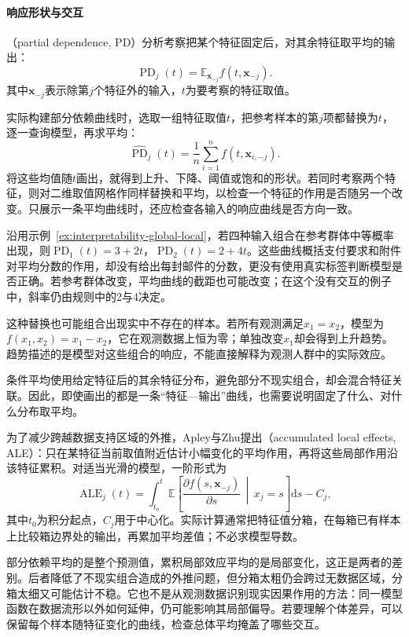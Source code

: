 \paragraph{响应形状与交互}

（partial dependence, PD）分析考察把某个特征固定后，对其余特征取平均的输出：
\[
 \operatorname{PD}_j(t)
 =\mathbb E_{\bm{x}_{-j}}f(t,\bm{x}_{-j}).
\]
其中$\bm{x}_{-j}$表示除第$j$个特征外的输入，$t$为要考察的特征取值。

实际构建部分依赖曲线时，选取一组特征取值$t$，把参考样本的第$j$项都替换为$t$，逐一查询模型，再求平均：
\[
 \widehat{\operatorname{PD}}_j(t)
 =\frac1n\sum_{i=1}^n f(t,\bm{x}_{i,-j}).
\]
将这些均值随$t$画出，就得到上升、下降、阈值或饱和的形状。若同时考察两个特征，则对二维取值网格作同样替换和平均，以检查一个特征的作用是否随另一个改变。只展示一条平均曲线时，还应检查各输入的响应曲线是否方向一致。

沿用示例~\ref{ex:interpretability-global-local}，若四种输入组合在参考群体中等概率出现，则$\operatorname{PD}_1(t)=3+2t$，$\operatorname{PD}_2(t)=2+4t$。这些曲线概括支付要求和附件对平均分数的作用，却没有给出每封邮件的分数，更没有使用真实标签判断模型是否正确。若参考群体改变，平均曲线的截距也可能改变；在这个没有交互的例子中，斜率仍由规则中的2与4决定。

这种替换也可能组合出现实中不存在的样本。若所有观测满足$x_1=x_2$，模型为$f(x_1,x_2)=x_1-x_2$，它在观测数据上恒为零；单独改变$x_1$却会得到上升趋势。趋势描述的是模型对这些组合的响应，不能直接解释为观测人群中的实际效应。

条件平均使用给定特征后的其余特征分布，避免部分不现实组合，却会混合特征关联。因此，即使画出的都是一条“特征—输出”曲线，也需要说明固定了什么、对什么分布取平均。

为了减少跨越数据支持区域的外推，Apley与Zhu提出（accumulated local effects, ALE）：只在某特征当前取值附近估计小幅变化的平均作用，再将这些局部作用沿该特征累积。对适当光滑的模型，一阶形式为
\begin{equation}
 \operatorname{ALE}_j(t)
 =\int_{t_0}^{t}
 \mathbb E\!\left[
 \frac{\partial f(s,\bm{x}_{-j})}{\partial s}
 \,\middle|\,x_j=s\right]\mathrm ds-C_j,
 \label{eq:interpretability-ale}
\end{equation}
其中$t_0$为积分起点，$C_j$用于中心化。实际计算通常把特征值分箱，在每箱已有样本上比较箱边界处的输出，再累加平均差值；不必求模型导数。

部分依赖平均的是整个预测值，累积局部效应平均的是局部变化，这正是两者的差别。后者降低了不现实组合造成的外推问题，但分箱太粗仍会跨过无数据区域，分箱太细又可能估计不稳。它也不是从观测数据识别现实因果作用的方法：同一模型函数在数据流形以外如何延伸，仍可能影响其局部偏导。若要理解个体差异，可以保留每个样本随特征变化的曲线，检查总体平均掩盖了哪些交互。


